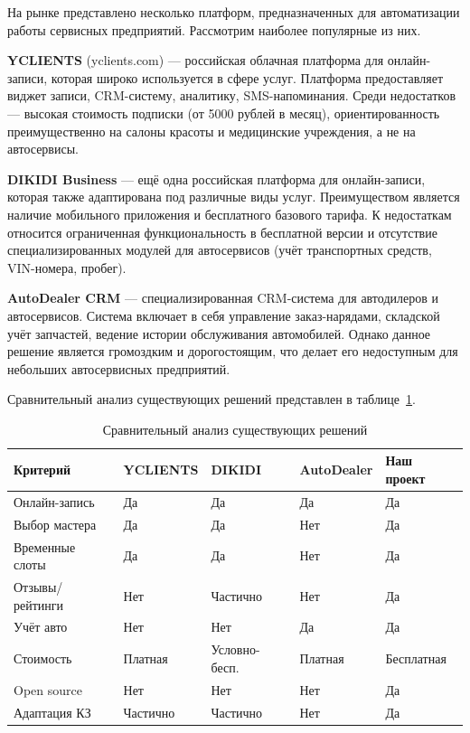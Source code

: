 \documentclass[14pt,a4paper,oneside]{extarticle}
\begin{document}
На рынке представлено несколько платформ, предназначенных для автоматизации работы сервисных предприятий. Рассмотрим наиболее популярные из них.

\textbf{YCLIENTS} (yclients.com) --- российская облачная платформа для онлайн-записи, которая широко используется в сфере услуг. Платформа предоставляет виджет записи, CRM-систему, аналитику, SMS-напоминания. Среди недостатков --- высокая стоимость подписки (от 5000 рублей в месяц), ориентированность преимущественно на салоны красоты и медицинские учреждения, а не на автосервисы.

\textbf{DIKIDI Business} --- ещё одна российская платформа для онлайн-записи, которая также адаптирована под различные виды услуг. Преимуществом является наличие мобильного приложения и бесплатного базового тарифа. К недостаткам относится ограниченная функциональность в бесплатной версии и отсутствие специализированных модулей для автосервисов (учёт транспортных средств, VIN-номера, пробег).

\textbf{AutoDealer CRM} --- специализированная CRM-система для автодилеров и автосервисов. Система включает в себя управление заказ-нарядами, складской учёт запчастей, ведение истории обслуживания автомобилей. Однако данное решение является громоздким и дорогостоящим, что делает его недоступным для небольших автосервисных предприятий.

Сравнительный анализ существующих решений представлен в таблице~\ref{tab:analogs}.

\begin{table}[H]
\caption{Сравнительный анализ существующих решений}\label{tab:analogs}
\centering
\begin{tabularx}{\textwidth}{|l|X|X|X|X|}
\hline
\textbf{Критерий} & \textbf{YCLIENTS} & \textbf{DIKIDI} & \textbf{AutoDealer} & \textbf{Наш проект} \\
\hline
Онлайн-запись & Да & Да & Да & Да \\
\hline
Выбор мастера & Да & Да & Нет & Да \\
\hline
Временные слоты & Да & Да & Нет & Да \\
\hline
Отзывы/рейтинги & Нет & Частично & Нет & Да \\
\hline
Учёт авто & Нет & Нет & Да & Да \\
\hline
Стоимость & Платная & Условно-бесп. & Платная & Бесплатная \\
\hline
Open source & Нет & Нет & Нет & Да \\
\hline
Адаптация КЗ & Частично & Частично & Нет & Да \\
\hline
\end{tabularx}
\end{table}
\end{document}
